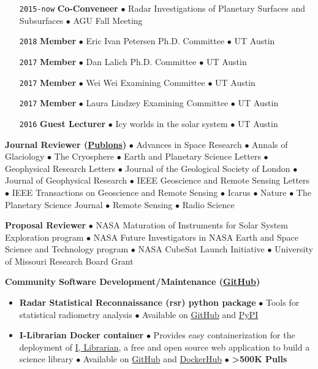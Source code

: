 \begin{itemize}[leftmargin=5.8em, labelsep=1.5em]
    \item[\texttt{2015-now}] \textbf{Co-Conveneer} $\bullet$  Radar Investigations of Planetary Surfaces and Subsurfaces $\bullet$ AGU Fall Meeting
    \item[\texttt{2018}] \textbf{Member} $\bullet$ Eric Ivan Petersen Ph.D. Committee $\bullet$ UT Austin
    \item[\texttt{2017}] \textbf{Member} $\bullet$ Dan Lalich Ph.D. Committee $\bullet$ UT Austin
    \item[\texttt{2017}] \textbf{Member} $\bullet$ Wei Wei Examining Committee $\bullet$ UT Austin
    \item[\texttt{2017}] \textbf{Member} $\bullet$ Laura Lindzey Examining Committee $\bullet$ UT Austin
    \item[\texttt{2016}] \textbf{Guest Lecturer} $\bullet$ Icy worlds in the solar system $\bullet$ UT Austin
\end{itemize}

\noindent\textbf{Journal Reviewer (\href{https://publons.com/author/1177202/cyril-grima\#profile}{Publons})}
$\bullet$ Advances in Space Research $\bullet$ Annals of Glaciology $\bullet$ The Cryosphere $\bullet$ Earth and Planetary Science Letters $\bullet$ Geophysical Research Letters $\bullet$ Journal of the Geological Society of London $\bullet$ Journal of Geophysical Research $\bullet$ IEEE Geoscience and Remote Sensing Letters $\bullet$ IEEE Transactions on Geoscience and Remote Sensing $\bullet$ Icarus $\bullet$ Nature $\bullet$ The Planetary Science Journal $\bullet$ Remote Sensing $\bullet$ Radio Science

\vspace{1em}
\noindent\textbf{Proposal Reviewer} $\bullet$
NASA Maturation of Instruments for Solar System Exploration program $\bullet$ NASA Future Investigators in NASA Earth and Space Science and Technology program $\bullet$ NASA CubeSat Launch Initiative $\bullet$ University of Missouri Research Board Grant

\vspace{1em}
\noindent\textbf{Community Software Development/Maintenance (\href{https://github.com/cgrima}{GitHub})}
\vspace{-.5em}

\begin{itemize}[leftmargin=*]
    \item
    \textbf{Radar Statistical Reconnaissance (rsr) python package} $\bullet$ Tools for statistical radiometry analysis $\bullet$ Available on \href{https://github.com/cgrima/rsr}{GitHub} and \href{https://pypi.org/project/rsr/}{PyPI}
    \vspace{-.5em}
    \item
    \textbf{I-Librarian Docker container} $\bullet$ Provides easy containerization for the deployment of \href{https://i-librarian.net/}{I, Librarian}, a free and open source web application to build a science library $\bullet$ Available on \href{https://github.com/cgrima/docker_i-librarian}{GitHub} and \href{https://hub.docker.com/r/cgrima/i-librarian}{DockerHub} $\bullet$ \textbf{>500K Pulls} 
\end{itemize}


